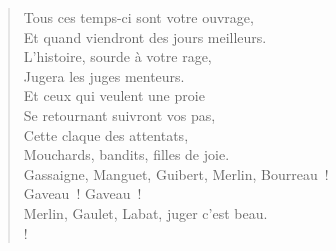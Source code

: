 \documentclass[french,twoside]{book} %
\begin{document}
\begin{verse}
\hspace{1em}Tous ces temps-ci sont votre ouvrage,\\
\hspace{1em}Et quand viendront des jours meilleurs.\\
\hspace{1em}L’histoire, sourde à votre rage,\\
\hspace{1em}Jugera les juges menteurs.\\
\hspace{1em}Et ceux qui veulent une proie\\
\hspace{1em}Se retournant suivront vos pas,\\
\hspace{1em}Cette claque des attentats,\\
\hspace{1em}Mouchards, bandits, filles de joie.\\
Gassaigne, Manguet, Guibert, Merlin, Bourreau !\\
\hspace{1em}\hspace{1em}Gaveau ! Gaveau !\\
Merlin, Gaulet, Labat, juger c’est beau.\\!
\end{verse}
\end{document}
